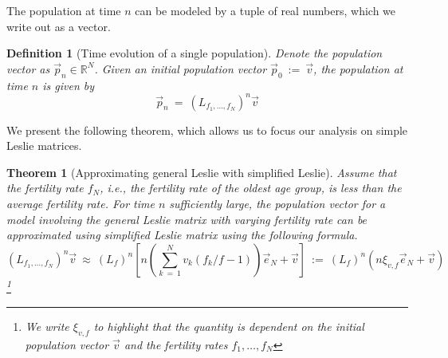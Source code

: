 \documentclass[11pt,reqno]{amsart}
\numberwithin{equation}{section}
\theoremstyle{plain}
\newtheorem{definition}[thm]{Definition}
\newtheorem{theorem}[thm]{Theorem}
\begin{document}
The population at time $n$ can be modeled by a tuple of real numbers, which we write out as a vector. 

\begin{definition}[Time evolution of a single population]
Denote the population vector as $\vec p_n \in \mathbb R^N$. 
Given an initial population vector $\vec p_0 \ := \ \vec v$, the population at time $n$ is given by 
\begin{equation}
    \vec p_n \ =\ (L_{f_1, \dots, f_N})^n \vec v
\end{equation}
\end{definition}

We present the following theorem, which allows us to focus our 
analysis on simple Leslie matrices.

\begin{theorem} [Approximating general Leslie with simplified Leslie]
    Assume that the fertility rate $f_N$, i.e., the fertility rate of the oldest 
    age group, is less than the average fertility rate. For time $n$ sufficiently large, the population vector for a model 
    involving the general Leslie matrix with varying fertility rate can be approximated using simplified Leslie matrix using the following formula. 
    \begin{equation}\label{eqn:simpleApprox}
        (L_{f_1, \dots, f_N})^n \vec v\ \approx \ 
        (L_f)^n \left[n\left(\sum_{k \ = \  1}^N v_k(f_k/f -1)\right)\vec e_N  + \vec v\right] \ := \ 
        (L_f)^n \left(n\xi_{v, f}\vec e_N  + \vec v\right)
    \end{equation}\footnote{We write $\xi_{v, f}$ to highlight that the quantity is dependent on the initial population vector $\vec v$ and the fertility rates $f_1,\dots, f_N$}
\end{theorem}
\end{document}
